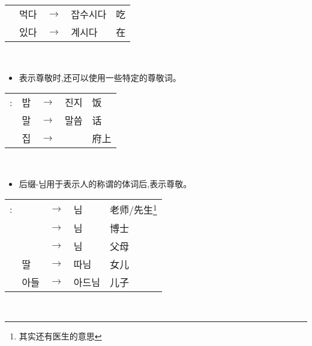 \begin{grammar}
\begin{grammarsect}[\kr -(으){}시-]
\begin{tabular}{lllll}
            &\kr 먹다 &$\to$&\kr 잡수시다&吃\\
            &\kr 있다 &$\to$&\kr 계시다&在
        \end{tabular}\\
        \begin{itemize}
            \item 表示尊敬时,还可以使用一些特定的尊敬词。
        \end{itemize}
        \begin{tabular}{lllll}
            \kr \ruby{例}{예}: &\kr 밥&$\to$& \kr 진지& 饭\\
            &\kr 말&$\to$&\kr 말씀& 话\\
            &\kr 집&$\to$& \kr \ruby{宅}{댁}& 府上
        \end{tabular}\\
        \begin{itemize}
            \item 后缀{\kr -님}用于表示人的称谓的体词后,表示尊敬。
        \end{itemize}
        \begin{tabular}{lllll}
            \kr \ruby{例}{예}:&\kr \ruby{先生}{선생}&$\to$&\kr  \ruby{先生}{선생}님 &老师/先生\footnote{其实还有医生的意思}\\
            &\kr \ruby{博士}{박사} &$\to$&\kr  \ruby{博士}{박사}님 &博士 \\
            &\kr \ruby{父母}{부모} &$\to$&\kr  \ruby{父母}{부모}님 &父母 \\
            &\kr 딸&$\to$&\kr  따님 &女儿 \\
            &\kr 아들 &$\to$&\kr  아드님 &儿子
        \end{tabular}\\
    \end{grammarsect}
\end{grammar}
